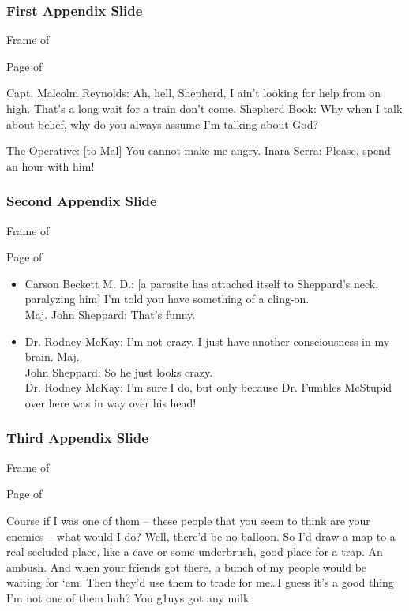 \documentclass[aspectratio=169]{beamer}
\newcommand{\printpagesinfo}{%
	Frame \insertframenumber{} of \inserttotalframenumber{}

	Page \insertpagenumber{} of \insertdocumentendpage{}
}
\begin{document}
\begin{frame}
	\frametitle{First Appendix Slide}

	\printpagesinfo

	Capt. Malcolm Reynolds: Ah, hell, Shepherd, I ain't looking for help from on high. That's a long wait for a train don't come. Shepherd Book: Why when I talk about belief, why do you always assume I'm talking about God?

	The Operative: [to Mal] You cannot make me angry. Inara Serra: Please, spend an hour with him!
\end{frame}
\begin{frame}
	\frametitle{Second Appendix Slide}

	\printpagesinfo

	\begin{itemize}
		\item<+-> Carson Beckett M. D.: [a parasite has attached itself to Sheppard's neck, paralyzing him] I'm told you have something of a cling-on.\\
		Maj. John Sheppard: That's funny.
		\item<+-> Dr. Rodney McKay: I'm not crazy. I just have another consciousness in my brain. Maj.\\
		John Sheppard: So he just looks crazy.\\
		Dr. Rodney McKay: I'm sure I do, but only because Dr. Fumbles McStupid over here was in way over his head!
	\end{itemize}
\end{frame}
\begin{frame}
	\frametitle{Third Appendix Slide}

	\printpagesinfo

	Course if I was one of them – these people that you seem to think are your enemies – what would I do? Well, there’d be no balloon. So I’d draw a map to a real secluded place, like a cave or some underbrush, good place for a trap. An ambush. And when your friends got there, a bunch of my people would be waiting for ‘em. Then they’d use them to trade for me…I guess it’s a good thing I’m not one of them huh? You g1uys got any milk
\end{frame}
\end{document}
